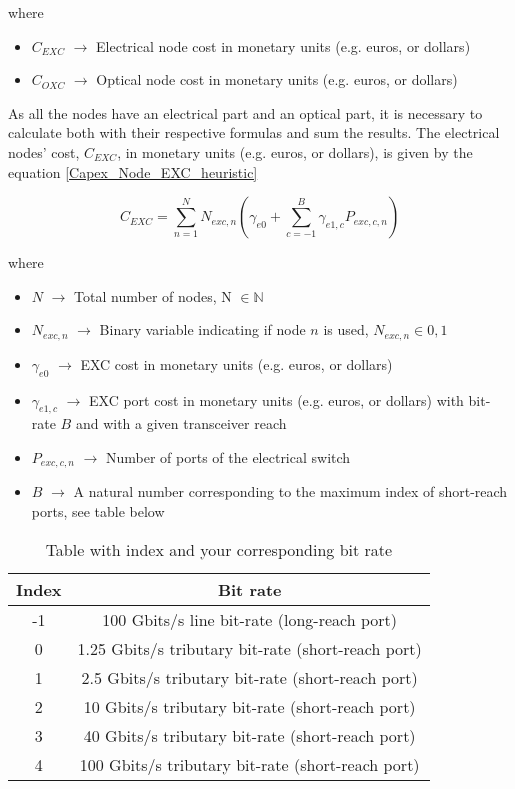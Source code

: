 \noindent
where

\begin{itemize}
\item {$C_{EXC}$        $\rightarrow$   Electrical node cost in monetary units (e.g. euros, or dollars)}
\item {$C_{OXC}$        $\rightarrow$   Optical node cost in monetary units (e.g. euros, or dollars)}
\end{itemize}

\vspace{11pt}
As all the nodes have an electrical part and an optical part, it is necessary to calculate both with their respective formulas and sum the results. The electrical nodes' cost, $C_{EXC}$, in monetary units (e.g. euros, or dollars), is given by the equation \ref{Capex_Node_EXC_heuristic}

\begin{equation}
C_{EXC} = \sum_{n=1}^{N} N_{exc,n} \left( \gamma_{e0} + \sum_{c=-1}^B \gamma_{e1,c} P_{exc,c,n} \right)
\label{Capex_Node_EXC_heuristic}
\end{equation}

\noindent
where

\begin{itemize}
\item{$N$				$\rightarrow$	Total number of nodes, N $\in \mathbb{N}$}
\item{$N_{exc,n}$		$\rightarrow$	Binary variable indicating if node $n$ is used, $N_{exc,n} \in {0, 1}$}
\item{$\gamma_{e0}$ 	$\rightarrow$	EXC cost in monetary units (e.g. euros, or dollars)}
\item{$\gamma_{e1,c}$	$\rightarrow$	EXC port cost in monetary units (e.g. euros, or dollars) with bit-rate $B$ and with a given transceiver reach}
\item{$P_{exc,c,n}$	    $\rightarrow$	Number of ports of the electrical switch}
\item{$B$           	$\rightarrow$	A natural number corresponding to the maximum index of short-reach ports, see table below}
\end{itemize}

\begin{table}[H]
\centering
\begin{tabular}{|c|c|}
  \hline
  Index & Bit rate \\
 \hline\hline
  -1 & 100 Gbits/s line bit-rate (long-reach port) \\
  0 & 1.25 Gbits/s tributary bit-rate (short-reach port) \\
  1 & 2.5 Gbits/s tributary bit-rate (short-reach port) \\
  2 & 10 Gbits/s tributary bit-rate (short-reach port) \\
  3 & 40 Gbits/s tributary bit-rate (short-reach port) \\
  4 & 100 Gbits/s tributary bit-rate (short-reach port) \\
  \hline
\end{tabular}
\caption{Table with index and your corresponding bit rate}
\label{table_bitrate_heuristic}
\end{table}

